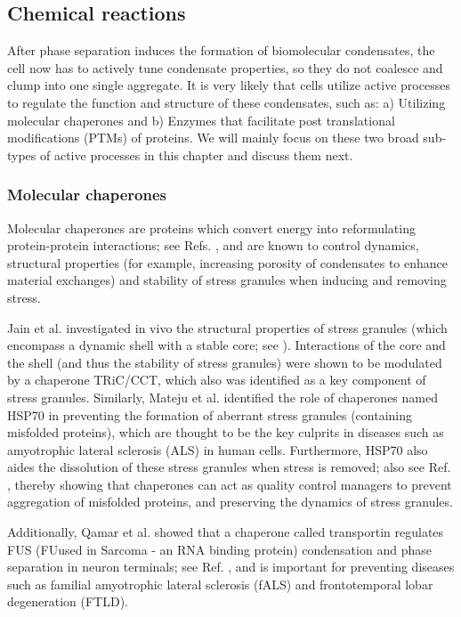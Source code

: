\subsection{Chemical reactions}

After phase separation induces the formation of biomolecular condensates, the cell now has to actively tune condensate properties, so they do not coalesce and clump into one single aggregate.
It is very likely that cells utilize active processes to regulate the function and structure of these condensates, such as: a) Utilizing molecular chaperones and b) Enzymes that facilitate post translational modifications (PTMs) of proteins.
We will mainly focus on these two broad sub-types of active processes in this chapter and discuss them next. 

\subsubsection{Molecular chaperones}

Molecular chaperones are proteins which convert energy into reformulating protein-protein interactions; see Refs. \cite{Akerfelt2010,Tyedmers2010}, and are known to control dynamics, structural properties (for example, increasing porosity of condensates to enhance material exchanges) and stability of stress granules when inducing and removing stress.

Jain et al. \cite{JAIN2016487} investigated in vivo the structural properties of stress granules (which encompass a dynamic shell with a stable core; see ).
Interactions of the core and the shell (and thus the stability of stress granules) were shown to be modulated by a chaperone TRiC/CCT, which also was identified as a key component of stress granules.
Similarly, Mateju et al. \cite{Mateju2017} identified the role of chaperones named HSP70 in preventing the formation of aberrant stress granules (containing misfolded proteins), which are thought to be the key culprits in diseases such as amyotrophic lateral sclerosis (ALS) in human cells.
Furthermore, HSP70 also aides the dissolution of these stress granules when stress is removed; also see Ref. \cite{Wallace2015}, thereby showing that chaperones can act as quality control managers to prevent aggregation of misfolded proteins, and preserving the dynamics of stress granules. 

Additionally, Qamar et al. \cite{QAMAR2018720} showed that a chaperone called transportin regulates FUS (FUused in Sarcoma - an RNA binding protein) condensation and phase separation in neuron terminals; see Ref. \cite{Chen2019}, and is important for preventing diseases such as familial amyotrophic lateral sclerosis (fALS) and frontotemporal lobar degeneration (FTLD).

